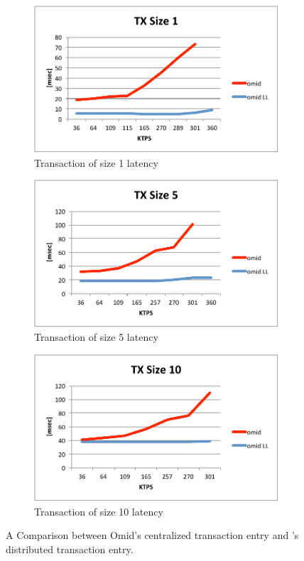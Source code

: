 \begin{figure}[!h]
  \centering
  \begin{subfigure}[t]{0.4\textwidth}
	\includegraphics[width=\textwidth]{figs/omdLL1.pdf}
	\caption[]{Transaction of size 1 latency}
    \label{fig:ll:tx1}
  \end{subfigure}
  \begin{subfigure}[t]{0.4\textwidth}
	\includegraphics[width=\textwidth]{figs/omdLL5.pdf}
	\caption[]{Transaction of size 5 latency}
    \label{fig:l:tx5}
  \end{subfigure}
    \begin{subfigure}[t]{0.4\textwidth}
	\includegraphics[width=\textwidth]{figs/omdLL10.pdf}
	\caption[]{Transaction of size 10 latency}
    \label{fig:l:tx10}
  \end{subfigure}			
  \caption{A Comparison between Omid's centralized transaction entry and \sys's distributed transaction entry.}
  \label{fig:throughput-latency}
\end{figure}
